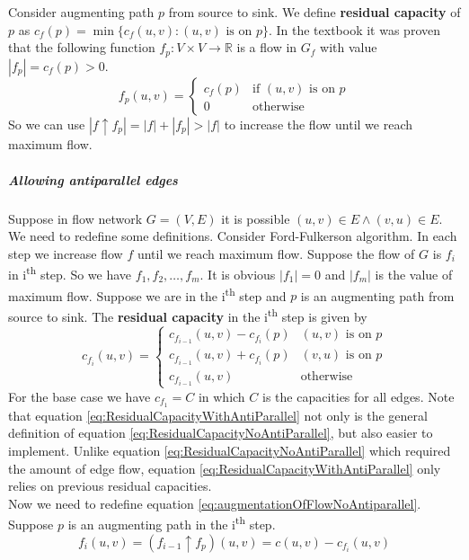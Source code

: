 \documentclass{book}
\begin{document}
	Consider augmenting path $p$ from source to sink. We define \textbf{residual capacity} of $p$ as $c_f(p) = \min\{c_f(u, v) : (u, v) \text{ is on } p\}$. In the textbook it was proven that the following function $f_p : V \times V \rightarrow \mathbb{R}$ is a flow in $G_f$ with value $|f_p| = c_f(p) > 0$.
	\begin{equation*}
	f_p(u, v) = \begin{cases}
	c_f(p) & \text{if } (u, v) \text{ is on } p \\
	0 & \text{otherwise}
	\end{cases}
	\end{equation*}
	So we can use $|f \uparrow f_p| = |f| + |f_p| > |f|$ to increase the flow until we reach maximum flow.
	\subparagraph{Allowing antiparallel edges}
	Suppose in flow network $G = (V, E)$ it is possible $(u, v) \in E \land (v, u) \in E$. We need to redefine some definitions. Consider Ford-Fulkerson algorithm. In each step we increase flow $f$ until we reach maximum flow. Suppose the flow of $G$ is $f_i$ in i\textsuperscript{th} step. So we have $f_1, f_2, \dots, f_m$. It is obvious $|f_1| = 0$ and $|f_m|$ is the value of maximum flow. Suppose we are in the i\textsuperscript{th} step and $p$ is an augmenting path from source to sink. The \textbf{residual capacity} in the i\textsuperscript{th} step is given by
	\begin{equation}
	\label{eq:ResidualCapacityWithAntiParallel}
		c_{f_i}(u, v) = \begin{cases}
		c_{f_{i - 1}}(u, v) - c_{f_i}(p) & (u, v) \text{ is on } p \\
		c_{f_{i - 1}}(u, v) + c_{f_i}(p) & (v, u) \text{ is on } p \\
		c_{f_{i - 1}}(u, v) & \text{otherwise}
		\end{cases}
	\end{equation}
	For the base case we have $c_{f_1} = C$ in which $C$ is the capacities for all edges. Note that equation \ref{eq:ResidualCapacityWithAntiParallel} not only is the general definition of equation \ref{eq:ResidualCapacityNoAntiParallel}, but also easier to implement. Unlike equation \ref{eq:ResidualCapacityNoAntiParallel} which required the amount of edge flow, equation \ref{eq:ResidualCapacityWithAntiParallel} only relies on previous residual capacities.\\
	Now we need to redefine equation \ref{eq:augmentationOfFlowNoAntiparallel}. Suppose $p$ is an augmenting path in the i\textsuperscript{th} step.
	\begin{equation}
		f_i(u, v) = (f_{i - 1} \uparrow f_p)(u, v) = c(u, v) - c_{f_i}(u, v)
	\end{equation}
\end{document}
